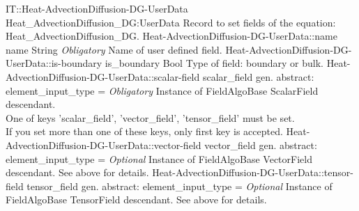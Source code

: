 \begin{RecordType}
	{IT::Heat-AdvectionDiffusion-DG-UserData}
	{Heat{\_}AdvectionDiffusion{\_}DG:UserData}
	{}%
	{}%
	{{{Record to set fields of the equation: Heat{\_}AdvectionDiffusion{\_}DG.}%
}}
		\RecKey
			{Heat-AdvectionDiffusion-DG-UserData::name}
			{name}
			{{String}}{}
			{ \it{Obligatory}}
			{{{Name of user defined field.}%
}}
		\RecKey
			{Heat-AdvectionDiffusion-DG-UserData::is-boundary}
			{is{\_}boundary}
			{{Bool}}{}
			{ }
			{{{Type of field: boundary or bulk.}%
}}
		\RecKey
			{Heat-AdvectionDiffusion-DG-UserData::scalar-field}
			{scalar{\_}field}
			{{gen. abstract: }}{{element{\_}input{\_}type}{ = }}
			{ \it{Obligatory}}
			{{{Instance of FieldAlgoBase ScalarField descendant.}\\{
One of keys 'scalar{\_}field', 'vector{\_}field', 'tensor{\_}field' must be set.}\\{
If you set more than one of these keys, only first key is accepted.}%
}}
		\RecKey
			{Heat-AdvectionDiffusion-DG-UserData::vector-field}
			{vector{\_}field}
			{{gen. abstract: }}{{element{\_}input{\_}type}{ = }}
			{ \it{Optional}}
			{{{Instance of FieldAlgoBase VectorField descendant.
See above for details.}%
}}
		\RecKey
			{Heat-AdvectionDiffusion-DG-UserData::tensor-field}
			{tensor{\_}field}
			{{gen. abstract: }}{{element{\_}input{\_}type}{ = }}
			{ \it{Optional}}
			{{{Instance of FieldAlgoBase TensorField descendant.
See above for details.}%
}}
\end{RecordType}

